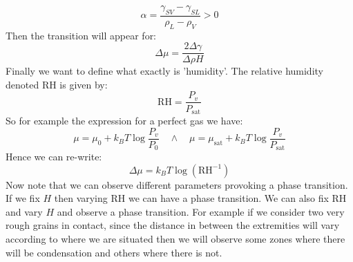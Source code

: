 \documentclass[10pt,a4paper]{book}
\begin{document}
\[
\alpha = \frac{\gamma_{SV} - \gamma_{SL}}{\rho_L - \rho_V} > 0
\]
Then the transition will appear for:
\[
\Delta \mu = \frac{2 \Delta \gamma}{\Delta \rho H}
\]
Finally we want to define what exactly is 'humidity'. The relative humidity denoted RH is given by:
\[
\text{RH} = \frac{P_v}{P_\text{sat}}
\]
So for example the expression for a perfect gas we have:
\[
\mu = \mu_0  + k_B T \log \frac{P_v}{P_0} \quad \land \quad \mu = \mu_\text{sat} + k_B T \log \frac{P_v}{P_\text{sat}}
\]
Hence we can re-write:
\[
\Delta\mu = k_B T \log (\text{RH}^{-1})
\]
Now note that we can observe different parameters provoking a phase transition. If we fix $H$ then varying RH we can have a phase transition. We can also fix RH and vary $H$ and observe a phase transition. For example if we consider two very rough grains in contact, since the distance in between the extremities will vary according to where we are situated then we will observe some zones where there will be condensation and others where there is not.
\end{document}
